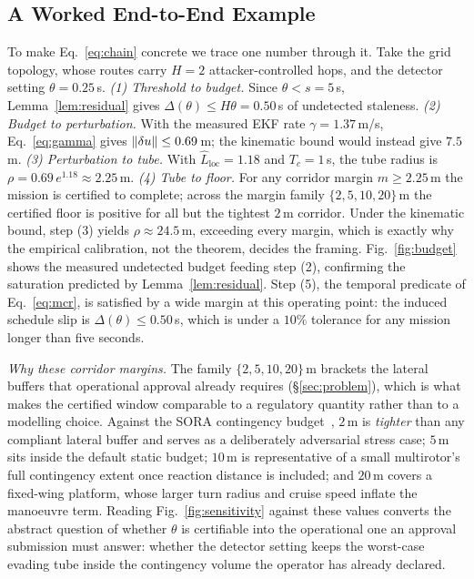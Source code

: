\begin{table}[t]
\centering
\caption{Instantiated constants and their provenance. The one pending numeric
constant is the PAC--Bayes prior/posterior KL, which we flag rather than
substitute.}
\label{tab:constants}
\small
\renewcommand{\arraystretch}{1.05}

\end{table}

\subsection{A Worked End-to-End Example}
\label{sec:worked}
To make Eq.~\eqref{eq:chain} concrete we trace one number through it. Take the grid
topology, whose routes carry $H=2$ attacker-controlled hops, and the detector
setting $\theta=0.25$\,s. \emph{(1) Threshold to budget.} Since
$\theta<s=5$\,s, Lemma~\ref{lem:residual} gives $\Delta(\theta)\le H\theta=0.50$\,s
of undetected staleness. \emph{(2) Budget to perturbation.} With the measured
EKF rate $\gamma=1.37$\,m/s, Eq.~\eqref{eq:gamma} gives
$\left\lVert \delta u\right\rVert\le0.69$\,m; the kinematic bound would instead give $7.5$\,m.
\emph{(3) Perturbation to tube.} With $\hat L_{\mathrm{loc}}=1.18$ and
$T_c=1$\,s, the tube radius is $\rho=0.69\,e^{1.18}\approx2.25$\,m. \emph{(4) Tube to
floor.} For any corridor margin $m\ge2.25$\,m the mission is certified to
complete; across the margin family $\{2,5,10,20\}$\,m the certified floor is
positive for all but the tightest $2$\,m corridor. Under the kinematic bound,
step (3) yields $\rho\approx24.5$\,m, exceeding every margin, which is exactly
why the empirical calibration, not the theorem, decides the framing.
Fig.~\ref{fig:budget} shows the measured undetected budget feeding step (2),
confirming the saturation predicted by Lemma~\ref{lem:residual}. Step (5), the
temporal predicate of Eq.~\eqref{eq:mcr}, is satisfied by a wide margin at this
operating point: the induced schedule slip is $\Delta(\theta)\le0.50$\,s, which
is under a $10\%$ tolerance for any mission longer than five seconds.

\emph{Why these corridor margins.} The family $\{2,5,10,20\}$\,m brackets the
lateral buffers that operational approval already requires
(\S\ref{sec:problem}), which is what makes the certified window comparable to a
regulatory quantity rather than to a modelling choice. Against the SORA
contingency budget~\cite{jarus_sora25,easa_uspace2021}, $2$\,m is \emph{tighter}
than any compliant lateral buffer and serves as a deliberately adversarial
stress case; $5$\,m sits inside the default static budget; $10$\,m is
representative of a small multirotor's full contingency extent once reaction
distance is included; and $20$\,m covers a fixed-wing platform, whose larger turn
radius and cruise speed inflate the manoeuvre term. Reading
Fig.~\ref{fig:sensitivity} against these values converts the abstract question
of whether $\theta$ is certifiable into the operational one an approval
submission must answer: whether the detector setting keeps the worst-case
evading tube inside the contingency volume the operator has already declared.

